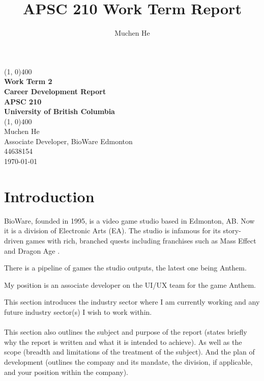 \documentclass[10pt,letterpaper]{article}
\author{Muchen He}
\title{APSC 210 Work Term Report}
\begin{document}
\begin{titlepage}
\begin{center}
\vspace*{3in}
\line(1, 0){400}\\
\Huge{\textbf{Work Term 2}}\\[0.2cm]
\large{\textbf{Career Development Report}}\\[1cm]
\Large{\textbf{APSC 210}}\\
\textbf{University of British Columbia}\\
\line(1, 0){400}\\
\vfill
\Large{Muchen He}\\
\large{Associate Developer, BioWare Edmonton}\\
44638154\\

\today \\
\end{center}
\end{titlepage}

\setcounter{secnumdepth}{3}
\tableofcontents
\thispagestyle{empty}
\clearpage

\thispagestyle{empty}
\listoffigures 
\listoftables
\newpage

\setcounter{page}{1}
\setcounter{section}{-1}

\section{Introduction}\label{introduction}

BioWare, founded in 1995, is a video game studio based in Edmonton, AB. Now it is a division of Electronic Arts (EA). The studio is infamous for its story-driven games with rich, branched quests including franchises such as Mass Effect and Dragon Age \cite{bioware} \cite{bioware-wiki} \cite{bioware-list}.

There is a pipeline of games the studio outputs, the latest one being Anthem. 

My position is an associate developer on the UI/UX team for the game Anthem. 

This section introduces the industry sector where I am currently working and any future industry sector(s) I wish to work within. \\
\\
This section also outlines the subject and purpose of the report (states briefly why the report is written and what it is intended to achieve). As well as the scope (breadth and limitations of the treatment of the subject). And the plan of development (outlines the company and its mandate, the division, if applicable, and your position within the company). \\
\\
\end{document}
